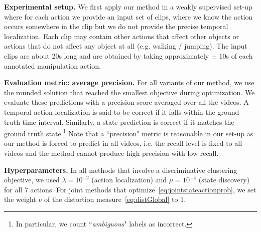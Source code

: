 \noindent\textbf{Experimental setup.}
We first apply our method in a weakly supervised set-up where for each action we provide an input set of clips, where we know the action occurs somewhere in the clip
but we do not provide the precise temporal localization.  Each clip may contain other actions that affect other objects or actions that do not affect any object at all (e.g. walking / jumping). The input clips are about 20s long and are obtained by taking approximately $\pm$ 10s of each annotated manipulation action.  
%
%

%
%
%
%
%


\noindent\textbf{Evaluation metric: average precision.}
For all variants of our method, we use the rounded solution that reached the smallest objective during optimization.
We evaluate these predictions with a precision score averaged over all the videos.
A temporal action localization is said to be correct if it falls within the ground truth time interval.
Similarly, a state prediction is correct if it matches the ground truth state.\footnote{In particular, we count ``\textit{ambiguous}" labels as incorrect.}
Note that a ``precision" metric is reasonable in our set-up as our method is forced to predict in all videos, i.e. the recall level is fixed to all videos and the method cannot produce high precision with low recall. 

\noindent\textbf{Hyperparameters.}
In all methods that involve a discriminative clustering objective, we used $\lambda=10^{-2}$ (action localization) and $\mu=10^{-4}$ (state discovery) for all 7 actions. 
For joint methods that optimize~\eqref{eq:jointstateactionprob}, we set the weight $\nu$ of the distortion measure~\eqref{eq:distGlobal} to $1$.

